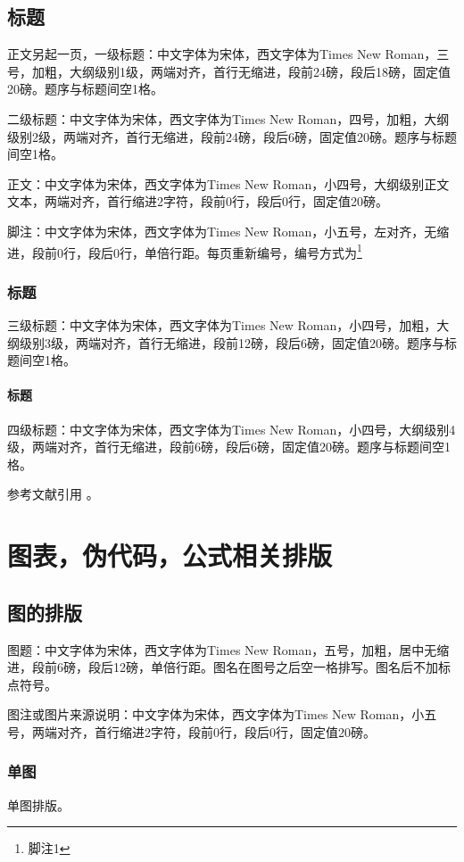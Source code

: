 \documentclass[GBK,UTF8,12pt,oneside,a4paper]{ctexbook}
\begin{document}
\section{标题}
正文另起一页，一级标题：中文字体为宋体，西文字体为Times New Roman，三号，加粗，大纲级别1级，两端对齐，首行无缩进，段前24磅，段后18磅，固定值20磅。题序与标题间空1格。

二级标题：中文字体为宋体，西文字体为Times New Roman，四号，加粗，大纲级别2级，两端对齐，首行无缩进，段前24磅，段后6磅，固定值20磅。题序与标题间空1格。

正文：中文字体为宋体，西文字体为Times New Roman，小四号，大纲级别正文文本，两端对齐，首行缩进2字符，段前0行，段后0行，固定值20磅。

脚注：中文字体为宋体，西文字体为Times New Roman，小五号，左对齐，无缩进，段前0行，段后0行，单倍行距。每页重新编号，编号方式为\footnote{脚注1}

\subsection{标题}
三级标题：中文字体为宋体，西文字体为Times New Roman，小四号，加粗，大纲级别3级，两端对齐，首行无缩进，段前12磅，段后6磅，固定值20磅。题序与标题间空1格。
\subsubsection{标题}
四级标题：中文字体为宋体，西文字体为Times New Roman，小四号，大纲级别4级，两端对齐，首行无缩进，段前6磅，段后6磅，固定值20磅。题序与标题间空1格。

参考文献引用
。
\chapter{图表，伪代码，公式相关排版}\label{elements}

\section{图的排版}
图题：中文字体为宋体，西文字体为Times New Roman，五号，加粗，居中无缩进，段前6磅，段后12磅，单倍行距。图名在图号之后空一格排写。图名后不加标点符号。

图注或图片来源说明：中文字体为宋体，西文字体为Times New Roman，小五号，两端对齐，首行缩进2字符，段前0行，段后0行，固定值20磅。

\subsection{单图}
单图排版。
\end{document}
